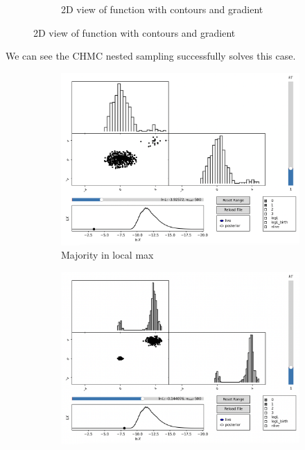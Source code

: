 \documentclass[11pt]{article}
\begin{document}
\begin{figure}[H]
\begin{subfigure}[b]{0.55\linewidth}
            \caption{2D view of function with contours and gradient}
        \end{subfigure}
        \label{dig:topotrap_function}
    \end{figure}

    We can see the CHMC nested sampling successfully solves this case.
    \begin{figure}[H]
        \centering
        \begin{subfigure}[b]{0.3\linewidth}
            \centering
            \includegraphics[width=\linewidth]{../figures/topotrap/NS1}
            \caption{Majority in local max}
        \end{subfigure}
        \begin{subfigure}[b]{0.3\linewidth}
            \centering
            \includegraphics[width=\linewidth]{../figures/topotrap/NS2}

\end{subfigure}
\end{figure}
\end{document}
